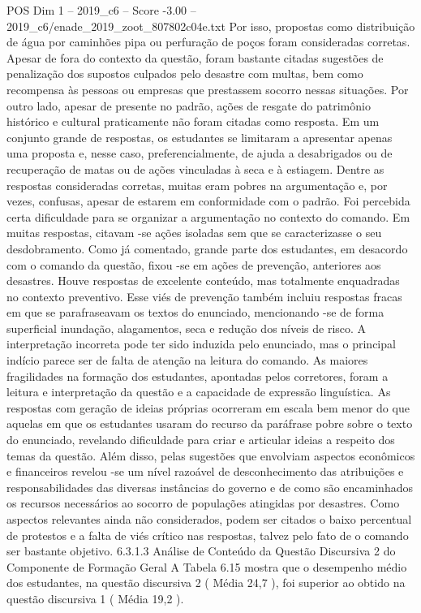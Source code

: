 \begin{textsample}{POS Dim 1 – 2019\_c6 – Score -3.00 – 2019\_c6/enade\_2019\_zoot\_807802c04e.txt}
Por isso, propostas como distribuição de água por caminhões pipa ou perfuração de poços foram consideradas corretas.
Apesar de fora do contexto da questão, foram bastante citadas sugestões de penalização dos supostos culpados pelo desastre com multas, bem como recompensa às pessoas ou empresas que prestassem socorro nessas situações.
Por outro lado, apesar de presente no padrão, ações de resgate do patrimônio histórico e cultural praticamente não foram citadas como resposta.
Em um conjunto grande de respostas, os estudantes se limitaram a apresentar apenas uma proposta e, nesse caso, preferencialmente, de ajuda a desabrigados ou de recuperação de matas ou de ações vinculadas à seca e à estiagem.
Dentre as respostas consideradas corretas, muitas eram pobres na argumentação e, por vezes, confusas, apesar de estarem em conformidade com o padrão.
Foi percebida certa dificuldade para se organizar a argumentação no contexto do comando.
Em muitas respostas, citavam -se ações isoladas sem que se caracterizasse o seu desdobramento.
Como já comentado, grande parte dos estudantes, em desacordo com o comando da questão, fixou -se em ações de prevenção, anteriores aos desastres.
Houve respostas de excelente conteúdo, mas totalmente enquadradas no contexto preventivo.
Esse viés de prevenção também incluiu respostas fracas em que se parafraseavam os textos do enunciado, mencionando -se de forma superficial inundação, alagamentos, seca e redução dos níveis de risco.
A interpretação incorreta pode ter sido induzida pelo enunciado, mas o principal indício parece ser de falta de atenção na leitura do comando.
As maiores fragilidades na formação dos estudantes, apontadas pelos corretores, foram a leitura e interpretação da questão e a capacidade de expressão linguística.
As respostas com geração de ideias próprias ocorreram em escala bem menor do que aquelas em que os estudantes usaram do recurso da paráfrase pobre sobre o texto do enunciado, revelando dificuldade para criar e articular ideias a respeito dos temas da questão.
Além disso, pelas sugestões que envolviam aspectos econômicos e financeiros revelou -se um nível razoável de desconhecimento das atribuições e responsabilidades das diversas instâncias do governo e de como são encaminhados os recursos necessários ao socorro de populações atingidas por desastres.
Como aspectos relevantes ainda não considerados, podem ser citados o baixo percentual de protestos e a falta de viés crítico nas respostas, talvez pelo fato de o comando ser bastante objetivo. 6.3.1.3 Análise de Conteúdo da Questão Discursiva 2 do Componente de Formação Geral A Tabela 6.15 mostra que o desempenho médio dos estudantes, na questão discursiva 2 ( Média 24,7 ), foi superior ao obtido na questão discursiva 1 ( Média 19,2 ).

\end{textsample}
